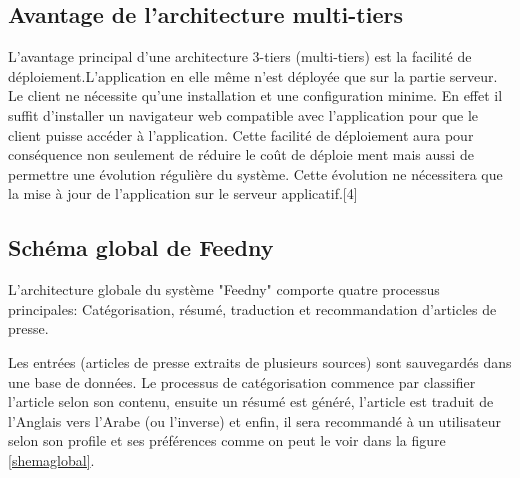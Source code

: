 \subsection{Avantage de l’architecture multi-tiers}
L’avantage principal d’une architecture 3-tiers (multi-tiers) est la facilité de déploiement.L’application
en elle même n’est déployée que sur la partie serveur.
Le client ne nécessite qu’une installation et une configuration minime.
En effet il suffit d’installer un navigateur web compatible avec l’application pour que le client
puisse accéder à l’application.
Cette facilité de déploiement aura pour conséquence non seulement de réduire le coût de déploie
ment mais aussi de permettre une évolution régulière du système. Cette évolution ne nécessitera
que la mise à jour de l’application sur le serveur applicatif.[4]

\subsection{Schéma global de \textquotedbl Feedny\textquotedbl}
L'architecture globale du système "Feedny" comporte quatre processus principales: Catégorisation, résumé, traduction et recommandation d'articles de presse.

Les entrées (articles de presse extraits de plusieurs sources) sont sauvegardés dans une base de données. Le processus de catégorisation commence par classifier l'article selon son contenu, ensuite un résumé est généré, l'article est traduit de l'Anglais vers l'Arabe (ou l'inverse) et enfin, il sera recommandé à un utilisateur selon son profile et ses préférences comme on peut le voir dans la figure \ref{shemaglobal}.

